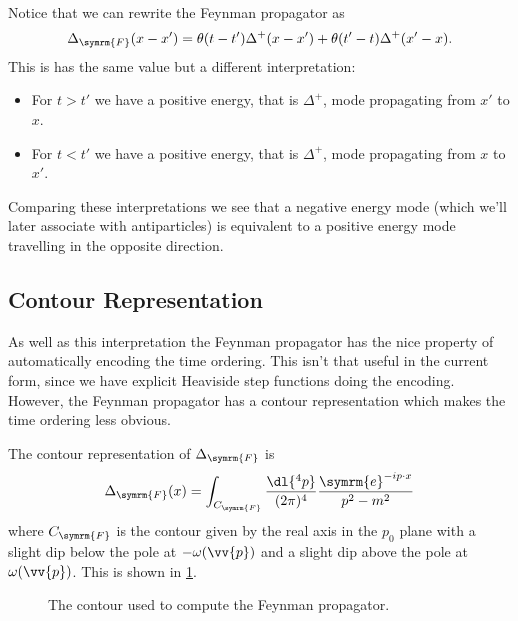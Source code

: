 \documentclass[fleqn]{NotesClass}
\newcommand{\e}{\symrm{e}}
\let\Re\relax
\let\Im\relax
\DeclareMathOperator{\Re}{Re}
\DeclareMathOperator{\Im}{Im}
\newcommand{\heaviside}{\theta}
\newcommand{\feynman}{\symrm{F}}
\begin{document}
    Notice that we can rewrite the Feynman propagator as
    \begin{equation}
        \Delta_{\feynman}(x - x') = \heaviside(t - t')\Delta^+(x - x') + \heaviside(t' - t)\Delta^+(x' - x).
    \end{equation}
    This is has the same value but a different interpretation:
    \begin{itemize}
        \item For \(t > t'\) we have a positive energy, that is \(\Delta^+\), mode propagating from \(x'\) to \(x\).
        \item For \(t < t'\) we have a positive energy, that is \(\Delta^+\), mode propagating from \(x\) to \(x'\).
    \end{itemize}
    
    Comparing these interpretations we see that a negative energy mode (which we'll later associate with antiparticles) is equivalent to a positive energy mode travelling in the opposite direction.
    
    \subsection{Contour Representation}
    As well as this interpretation the Feynman propagator has the nice property of automatically encoding the time ordering.
    This isn't that useful in the current form, since we have explicit Heaviside step functions doing the encoding.
    However, the Feynman propagator has a contour representation which makes the time ordering less obvious.
    
    The contour representation of \(\Delta_{\feynman}\) is
    \begin{equation}
        \Delta_{\feynman}(x) = \int_{C_{\feynman}} \frac{\dl{^4p}}{(2\pi)^4} \frac{\e^{-ip\cdot x}}{p^2 - m^2}
    \end{equation}
    where \(C_{\feynman}\) is the contour given by the real axis in the \(p_0\) plane with a slight dip below the pole at \(-\omega(\vv{p})\) and a slight dip above the pole at \(\omega(\vv{p})\).
    This is shown in \cref{fig:contour for feynman propagator}.
    
    \begin{figure}
        \caption{The contour used to compute the Feynman propagator.}
        \label{fig:contour for feynman propagator}
    \end{figure}
    
\end{document}

